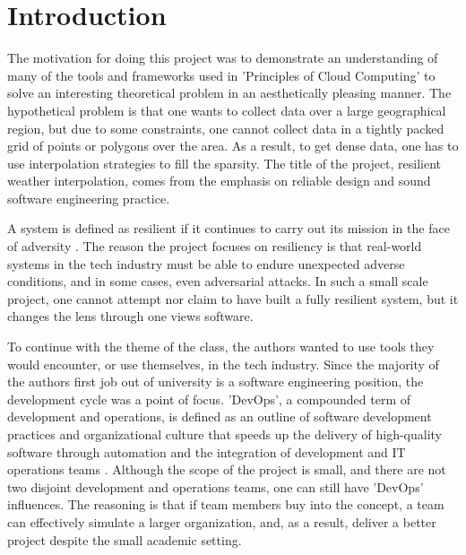 \section{Introduction}
The motivation for doing this project was to demonstrate an understanding of many of the tools and frameworks used in 'Principles of Cloud Computing' to solve an interesting theoretical problem in an aesthetically pleasing manner.
The hypothetical problem is that one wants to collect data over a large geographical region,
but due to some constraints,
one cannot collect data in a tightly packed grid of points or polygons over the area.
As a result, to get dense data,
one has to use interpolation strategies to fill the sparsity.
The title of the project, resilient weather interpolation,
comes from the emphasis on reliable design and sound software engineering practice.

A system is defined as resilient if it continues to carry out its mission in the face of adversity \cite{systemResilience}.
The reason the project focuses on resiliency is that real-world systems in the tech industry must be able to endure unexpected adverse conditions, 
and in some cases, even adversarial attacks. 
In such a small scale project, one cannot attempt nor claim to have built a fully resilient system,
but it changes the lens through one views software.

To continue with the theme of the class,
the authors wanted to use tools they would encounter, or use themselves,
in the tech industry. 
Since the majority of the authors first job out of university is a software engineering position,
the development cycle was a point of focus. 
'DevOps', a compounded term of development and operations,
is defined as an outline of software development practices and organizational culture that speeds up the delivery of high-quality software through automation and the integration of development and IT operations teams \cite{devops}.
Although the scope of the project is small,
and there are not two disjoint development and operations teams, 
one can still have 'DevOps' influences. 
The reasoning is that if team members buy into the concept,
a team can effectively simulate a larger organization, 
and, as a result, deliver a better project despite the small academic setting.